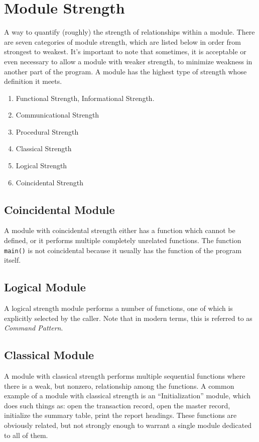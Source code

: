 \documentclass[format.tex]{subfiles}
\begin{document}
\section{Module Strength}
A way to quantify (roughly) the strength of relationships within a module.
There are seven categories of module strength, which are listed below in order
from strongest to weakest. It's important to note that sometimes, it is
acceptable or even necessary to allow a module with weaker strength, to
minimize weakness in another part of the program. A module has the highest
type of strength whose definition it meets.
\begin{enumerate}
\item Functional Strength, Informational Strength.
\item Communicational Strength
\item Procedural Strength
\item Classical Strength
\item Logical Strength
\item Coincidental Strength
\end{enumerate}

\subsection{Coincidental Module}
A module with coincidental strength either has a function which cannot be
defined, or it performs multiple completely unrelated functions. The function
\texttt{main()} is not coincidental because it usually has the function of the
program itself.

\subsection{Logical Module}
A logical strength module performs a number of functions, one of which is
explicitly selected by the caller. Note that in modern terms, this is referred
to as {\it Command Pattern}.

\subsection{Classical Module}
A module with classical strength performs multiple sequential functions where
there is a weak, but nonzero, relationship among the functions. A common
example of a module with classical strength is an ``Initialization'' module,
which does such things as: open the transaction record, open the master record,
initialize the summary table, print the report headings. These functions are
obviously related, but not strongly enough to warrant a single module dedicated
to all of them.
\end{document}
